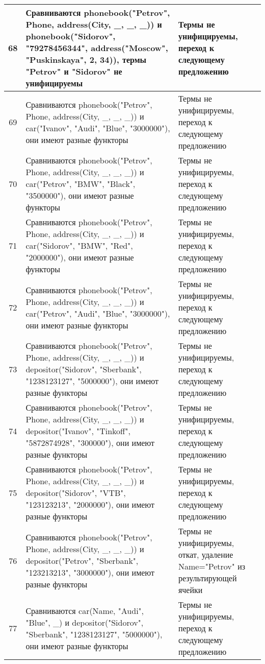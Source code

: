 \documentclass[a4paper,12pt]{article}
\begin{document}
\newpage
\begin{table}[ht!] 
	\begin{tabularx}{\linewidth}{|c|>{\centering}X|>{\centering}X|}
		\hline
		68 & Сравниваются phonebook("Petrov"{}, Phone, address(City, \_, \_, \_)) и phonebook("Sidorov"{}, "79278456344"{}, address("Moscow"{}, "Puskinskaya"{}, 2, 34)), термы  "Petrov"{} и "Sidorov"{} не унифицируемы & Термы не унифицируемы, переход к следующему предложению \tabularnewline
		\hline
		69 & Сравниваются phonebook("Petrov"{}, Phone, address(City, \_, \_, \_)) и car("Ivanov"{}, "Audi"{}, "Blue"{}, "3000000"), они имеют разные функторы & Термы не унифицируемы, переход к следующему предложению \tabularnewline
		\hline
		70 & Сравниваются phonebook("Petrov"{}, Phone, address(City, \_, \_, \_)) и car("Petrov"{}, "BMW"{}, "Black"{}, "3500000"), они имеют разные функторы & Термы не унифицируемы, переход к следующему предложению \tabularnewline
		\hline
		71 & Сравниваются phonebook("Petrov"{}, Phone, address(City, \_, \_, \_)) и car("Sidorov"{}, "BMW"{}, "Red"{}, "2000000"), они имеют разные функторы & Термы не унифицируемы, переход к следующему предложению \tabularnewline
		\hline
		72 & Сравниваются phonebook("Petrov"{}, Phone, address(City, \_, \_, \_)) и car("Petrov"{}, "Audi"{}, "Blue"{}, "3000000"), они имеют разные функторы & Термы не унифицируемы, переход к следующему предложению \tabularnewline
		\hline
		73 & Сравниваются phonebook("Petrov"{}, Phone, address(City, \_, \_, \_)) и depositor("Sidorov"{}, "Sberbank"{}, "1238123127"{}, "5000000"), они имеют разные функторы & Термы не унифицируемы, переход к следующему предложению \tabularnewline
		\hline
		74 & Сравниваются phonebook("Petrov"{}, Phone, address(City, \_, \_, \_)) и depositor("Ivanov"{}, "Tinkoff"{}, "5872874928"{}, "300000"), они имеют разные функторы & Термы не унифицируемы, переход к следующему предложению \tabularnewline
		\hline
		75 & Сравниваются phonebook("Petrov"{}, Phone, address(City, \_, \_, \_)) и depositor("Sidorov"{}, "VTB"{}, "123123213"{}, "2000000"), они имеют разные функторы & Термы не унифицируемы, переход к следующему предложению \tabularnewline
		\hline
		76 & Сравниваются phonebook("Petrov"{}, Phone, address(City, \_, \_, \_)) и depositor("Petrov"{}, "Sberbank"{}, "123213213"{}, "3000000"), они имеют разные функторы & Термы не унифицируемы, откат, удаление Name="Petrov"{} из результирующей ячейки \tabularnewline
		\hline
		77 & Сравниваются car(Name, "Audi"{}, "Blue"{}, \_) и depositor("Sidorov"{}, "Sberbank"{}, "1238123127"{}, "5000000"), они имеют разные функторы & Термы не унифицируемы, переход к следующему предложению \tabularnewline
		\hline
	\end{tabularx}
\end{table}
\end{document}
